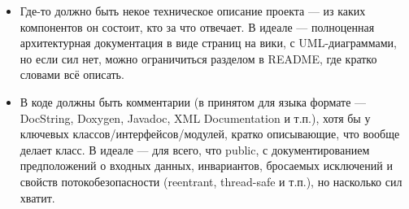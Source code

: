 \documentclass[a5paper]{article}
\begin{document}
\begin{itemize}
    \item Где-то должно быть некое техническое описание проекта --- из каких компонентов он состоит, кто за что отвечает. В идеале --- полноценная архитектурная документация в виде страниц на вики, с UML-диаграммами, но если сил нет, можно ограничиться разделом в README, где кратко словами всё описать.
    \item В коде должны быть комментарии (в принятом для языка формате --- DocString, Doxygen, Javadoc, XML Documentation и т.п.), хотя бы у ключевых классов/интерфейсов/модулей, кратко описывающие, что вообще делает класс. В идеале --- для всего, что public, с документированием предположений о входных данных, инвариантов, бросаемых исключений и свойств потокобезопасности (reentrant, thread-safe и т.п.), но насколько сил хватит.
\end{itemize}
\end{document}
